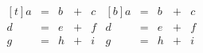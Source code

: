 $
      \begin{equation}
      \begin{aligned}[t]
      a & = & b & + & c \\
      d & = & e & + & f \\
      g & = & h & + & i
      \end{aligned}
      \begin{aligned}[b]
      a & = & b & + & c \\
      d & = & e & + & f \\
      g & = & h & + & i
      \end{aligned}
      \end{equation}
$
